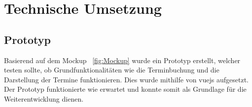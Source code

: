 
\section{Technische Umsetzung}\label{sec:technische-umsetzung}
\subsection{Prototyp}\label{subsec:prototyp}
Basierend auf dem Mockup ~\ref{fig:Mockup} wurde ein Prototyp erstellt, welcher testen sollte, ob Grundfunktionalitäten wie die Terminbuchung und die Darstellung der Termine funktionieren.
Dies wurde mithilfe von vuejs aufgesetzt.
\newline
Der Prototyp funktionierte wie erwartet und konnte somit als Grundlage für die Weiterentwicklung dienen.
